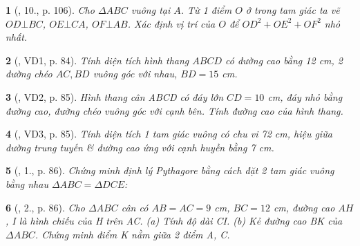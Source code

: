 \documentclass{article}
\newtheorem{baitoan}{}
\begin{document}
\begin{baitoan}[\cite{Tuyen_Toan_9_old}, 10., p. 106]
	Cho $\Delta ABC$ vuông tại $A$. Từ 1 điểm $O$ ở trong tam giác ta vẽ $OD\bot BC$, $OE\bot CA$, $OF\bot AB$. Xác định vị trí của $O$ để $OD^2 + OE^2 + OF^2$ nhỏ nhất.
\end{baitoan}

\begin{baitoan}[\cite{Binh_Toan_9_tap_1}, VD1, p. 84]
	Tính diện tích hình thang $ABCD$ có đường cao bằng {\rm12 cm}, 2 đường chéo $AC,BD$ vuông góc với nhau, $BD = 15$ {\rm cm}.
\end{baitoan}

\begin{baitoan}[\cite{Binh_Toan_9_tap_1}, VD2, p. 85]
	Hình thang cân ABCD có đáy lớn $CD = 10$ {\rm cm}, đáy nhỏ bằng đường cao, đường chéo vuông góc với cạnh bên. Tính đường cao của hình thang.
\end{baitoan}

\begin{baitoan}[\cite{Binh_Toan_9_tap_1}, VD3, p. 85]
	Tính diện tích 1 tam giác vuông có chu vi {\rm72 cm}, hiệu giữa đường trung tuyến \& đường cao ứng với cạnh huyền bằng {\rm7 cm}.
\end{baitoan}

\begin{baitoan}[\cite{Binh_Toan_9_tap_1}, 1., p. 86]
	Chứng minh định lý Pythagore bằng cách đặt 2 tam giác vuông bằng nhau $\Delta ABC = \Delta DCE$:
	\begin{center}
	\end{center}
\end{baitoan}

\begin{baitoan}[\cite{Binh_Toan_9_tap_1}, 2., p. 86]
	Cho $\Delta ABC$ cân có $AB = AC = 9$ {\rm cm}, $BC = 12$ {\rm cm}, đường cao $AH$, I là hình chiếu của H trên AC. (a) Tính độ dài CI. (b) Kẻ đường cao BK của $\Delta ABC$. Chứng minh điểm K nằm giữa 2 điểm A, C.
\end{baitoan}
\end{document}
